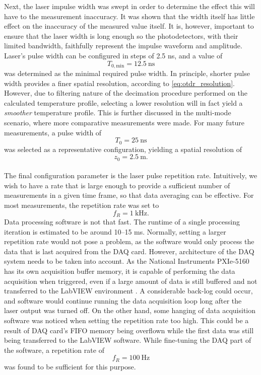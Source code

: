 \documentclass{standalone}
\begin{document}
Next, the laser impulse width was swept in order to determine the effect this will have to the measurement inaccuracy. It was shown that the width itself has little effect on the inaccuracy of the measured value itself. It is, however, important to ensure that the laser width is long enough so the photodetectors, with their limited bandwidth, faithfully represent the impulse waveform and amplitude. Laser's pulse width can be configured in steps of 2.5 ns, and a value of
\begin{equation}
T_{0,\textrm{min}} = \SI{12.5}{\nano \second}
\end{equation}
was determined as the minimal required pulse width. In principle, shorter pulse width provides a finer spatial resolution, according to \ref{eq:otdr_resolution}. However, due to filtering nature of the decimation procedure performed on the calculated temperature profile, selecting a lower resolution will in fact yield a \textit{smoother} temperature profile. This is further discussed in the multi-mode scenario, where more comparative measurements were made. For many future measurements, a pulse width of
\begin{equation}
T_0 = \SI{25}{\nano \second}
\end{equation}
was selected as a representative configuration, yielding a spatial resolution of
\begin{equation}
z_0 = \SI{2.5}{\meter} \textrm{.}
\end{equation} \\

The final configuration parameter is the laser pulse repetition rate. Intuitively, we wish to have a rate that is large enough to provide a sufficient number of measurements in a given time frame, so that data averaging can be effective. For most measurements, the repetition rate was set to
\begin{equation}
f_R = \SI{1}{\kilo \hertz} \textrm{.}
\end{equation}
Data processing software is not that fast. The runtime of a single processing iteration is estimated to be around 10--15 ms. Normally, setting a larger repetition rate would not pose a problem, as the software would only process the data that is last acquired from the DAQ card. However, architecture of the DAQ system needs to be taken into account. As the National Instruments PXIe-5160 has its own acquisition buffer memory, it is capable of performing the data acquisition when triggered, even if a large amount of data is still buffered and not transferred to the LabVIEW environment \cite{datasheet:daq}. A considerable back-log could occur, and software would continue running the data acquisition loop long after the laser output was turned off. On the other hand, some hanging of data acquisition software was noticed when setting the repetition rate too high. This could be a result of DAQ card's FIFO memory being overflown while the first data was still being transferred to the LabVIEW software. While fine-tuning the DAQ part of the software, a repetition rate of
\begin{equation}
f_R = \SI{100}{\hertz}
\end{equation}
was found to be sufficient for this purpose. \\
\end{document}
